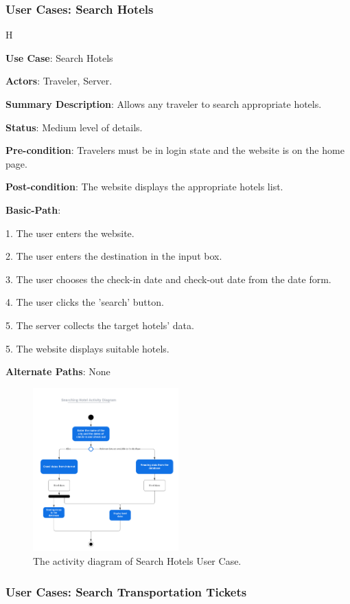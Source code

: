 \documentclass[conference]{IEEEtran}
\begin{document}
\subsubsection{User Cases: Search Hotels}
H
\textbf{ }

\textbf{Use Case}: Search Hotels

\textbf{Actors}: Traveler, Server.

\textbf{Summary Description}: Allows any traveler to search appropriate hotels.

\textbf{Status}: Medium level of details.

\textbf{Pre-condition}: Travelers must be in login state and the website is on the home page.

\textbf{Post-condition}: The website displays the appropriate hotels list.

\textbf{Basic-Path}:

1. The user enters the website.

2. The user enters the destination in the input box.

3. The user chooses the check-in date and check-out date from the date form.

4. The user clicks the 'search' button.

5. The server collects the target hotels' data.

5. The website displays suitable hotels.

\textbf{Alternate Paths}: None

\begin{figure}[htbp]
	\centerline{\includegraphics[width=0.5\textwidth]{Searching_Hotel_Activity_Diagram_2.pdf}}
	\caption{The activity diagram of Search Hotels User Case.}
	\label{fig7}
\end{figure}

\subsubsection{User Cases: Search Transportation Tickets}
\end{document}
